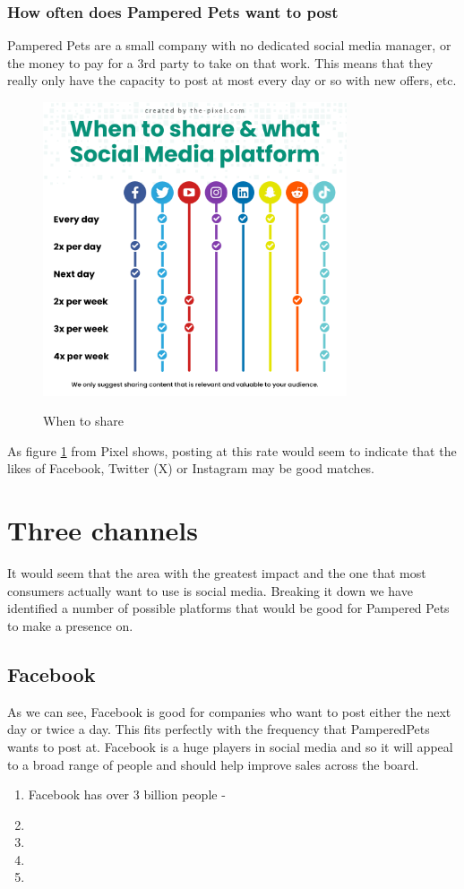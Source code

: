\documentclass{article}
\begin{document}
\subsubsection{How often does Pampered Pets want to post}
Pampered Pets are a small company with no dedicated social media manager, or the money to pay for a 3rd party to take on that work. 
This means that they really only have the capacity to post at most every day or so with new offers, etc. 
\begin{figure}[ht]
    \caption{When to share}
    \centering
    \includegraphics[width=0.8\textwidth]{sharing-on-social-media-channels}
    \label{fig:days}
    \end{figure}
    \FloatBarrier
 As figure \ref{fig:days} from Pixel \cite{pixel} shows, posting at this rate would seem to indicate that the likes of Facebook, Twitter (X) or Instagram may be good matches.

 \section{Three channels}
 It would seem that the area with the greatest impact and the one that most consumers actually want to use is social media.
 Breaking it down we have identified a number of possible platforms that would be good for Pampered Pets to make a presence on.
 \subsection{Facebook}
 As we can see, Facebook is good for companies who want to post either the next day or twice a day. This fits perfectly with the frequency that PamperedPets wants to post at.
Facebook is a huge players in social media and so it will appeal to a broad range of people and should help improve sales across the board.
\begin{enumerate}
	\item Facebook has over 3 billion people -
	\item 
	\item
	\item 
	\item
\end{enumerate}
\end{document}
